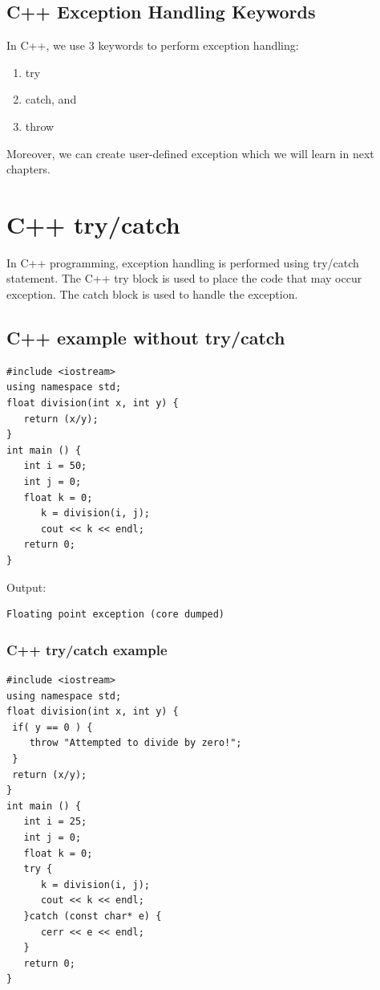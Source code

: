 \documentclass{book}
\begin{document}
\subsection{C++ Exception Handling Keywords}

In C++, we use 3 keywords to perform exception handling:

\begin{enumerate}
	\item try
\item catch, and
\item throw
\end{enumerate}

Moreover, we can create user-defined exception which we will learn in next chapters.

\section{C++ try/catch}

In C++ programming, exception handling is performed using try/catch statement. The C++ try block is used to place the code that may occur exception. The catch block is used to handle the exception.

\subsection{C++ example without try/catch}

\begin{lstlisting}
#include <iostream>  
using namespace std;  
float division(int x, int y) {  
   return (x/y);  
}  
int main () {  
   int i = 50;  
   int j = 0;  
   float k = 0;  
      k = division(i, j);  
      cout << k << endl;  
   return 0;  
}  
\end{lstlisting}

Output:

\begin{verbatim}
Floating point exception (core dumped)  
\end{verbatim}
 
\subsubsection{C++ try/catch example}

\begin{lstlisting}
#include <iostream>  
using namespace std;  
float division(int x, int y) {  
 if( y == 0 ) {  
	throw "Attempted to divide by zero!";  
 }  
 return (x/y);  
}  
int main () {  
   int i = 25;  
   int j = 0;  
   float k = 0;  
   try {  
      k = division(i, j);  
      cout << k << endl;  
   }catch (const char* e) {  
      cerr << e << endl;  
   }  
   return 0;  
}  
\end{lstlisting}
\end{document}
